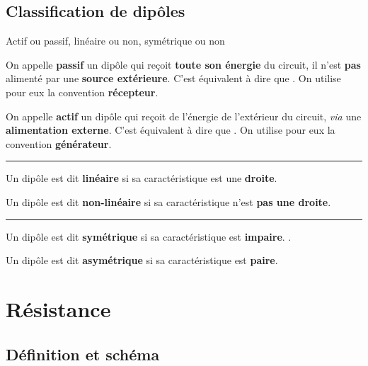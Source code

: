 \documentclass[../main/main.tex]{subfiles}
\begin{document}
\subsection{Classification de dipôles}
\begin{defi}[label=def:actifpassif]{{Actif ou passif, linéaire ou non,
    symétrique ou non}}

    \begin{defiside}
        
        On appelle \textbf{passif} un dipôle qui reçoit \textbf{toute son
        énergie} du circuit, il n'est \textbf{pas} alimenté par une
        \textbf{source extérieure}. C'est équivalent à dire que . On utilise pour eux la convention
        \textbf{récepteur}.

    \tcblower

        On appelle \textbf{actif} un dipôle qui reçoit de l'énergie de
        l'extérieur du circuit, \textit{via} une \textbf{alimentation externe}.
        C'est équivalent à dire que . On utilise pour eux la convention \textbf{générateur}.
    \end{defiside}
    \hrule
    \begin{defiside}
        Un dipôle est dit \textbf{linéaire} si sa caractéristique est une
        \textbf{droite}.

        \tcblower

        Un dipôle est dit \textbf{non-linéaire} si sa caractéristique n'est
        \textbf{pas une droite}.
    \end{defiside}
    \hrule
    \begin{defiside}
        Un dipôle est dit \textbf{symétrique} si sa caractéristique est
        \textbf{impaire}. .

        \tcblower

        Un dipôle est dit \textbf{asymétrique} si sa caractéristique est
        \textbf{paire}.
    \end{defiside}
\end{defi}

\section{Résistance}
\subsection{Définition et schéma}
\end{document}
